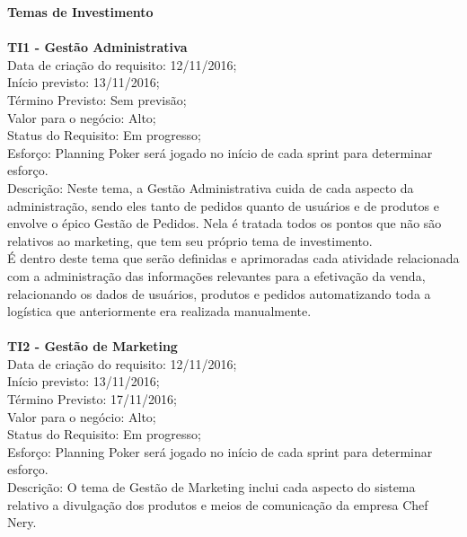 \begin{apendicesenv}
\textbf{Temas de Investimento} \\
\\
\textbf{TI1 - Gestão Administrativa} \\
\tab Data de criação do requisito: 12/11/2016;\\
\tab Início previsto: 13/11/2016;\\
\tab Término Previsto: Sem previsão;\\
\tab Valor para o negócio: Alto;\\
\tab Status do Requisito: Em progresso;\\
\tab Esforço: Planning Poker será jogado no início de cada sprint para determinar esforço.\\
\tab Descrição: Neste tema, a Gestão Administrativa cuida de cada aspecto da administração, sendo eles tanto de pedidos quanto de usuários e de produtos e envolve o épico Gestão de Pedidos. Nela é tratada todos os pontos que não são relativos ao marketing, que tem seu próprio tema de investimento.\\
\tab É dentro deste tema que serão definidas e aprimoradas cada atividade relacionada com a administração das informações relevantes para a efetivação da venda, relacionando os dados de usuários, produtos e pedidos automatizando toda a logística que anteriormente era realizada manualmente.\\
\\
\textbf{TI2 - Gestão de Marketing} \\
\tab Data de criação do requisito: 12/11/2016;\\
\tab Início previsto: 13/11/2016;\\
\tab Término Previsto: 17/11/2016;\\
\tab Valor para o negócio: Alto;\\
\tab Status do Requisito: Em progresso;\\
\tab Esforço: Planning Poker será jogado no início de cada sprint para determinar esforço.\\
\tab Descrição:  O tema de Gestão de Marketing inclui cada aspecto do sistema relativo a divulgação dos produtos e meios de comunicação da empresa Chef Nery.\\
\\


\end{apendicesenv}
